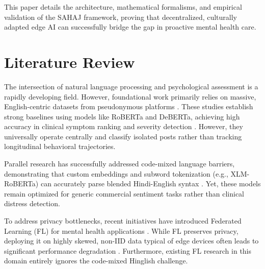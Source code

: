\documentclass[conference]{IEEEtran}
\begin{document}
This paper details the architecture, mathematical formalisms, and empirical validation of the SAHAJ framework, proving that decentralized, culturally adapted edge AI can successfully bridge the gap in proactive mental health care.

\section{Literature Review}
The intersection of natural language processing and psychological assessment is a rapidly developing field. However, foundational work primarily relies on massive, English-centric datasets from pseudonymous platforms \cite{b1,b3,b4,b5,b10}. These studies establish strong baselines using models like RoBERTa and DeBERTa, achieving high accuracy in clinical symptom ranking and severity detection \cite{b3,b4}. However, they universally operate centrally and classify isolated posts rather than tracking longitudinal behavioral trajectories.

Parallel research has successfully addressed code-mixed language barriers, demonstrating that custom embeddings and subword tokenization (e.g., XLM-RoBERTa) can accurately parse blended Hindi-English syntax \cite{b7,b8,b9}. Yet, these models remain optimized for generic commercial sentiment tasks rather than clinical distress detection.

To address privacy bottlenecks, recent initiatives have introduced Federated Learning (FL) for mental health applications \cite{b2,b6,b11}. While FL preserves privacy, deploying it on highly skewed, non-IID data typical of edge devices often leads to significant performance degradation \cite{b6,b12}. Furthermore, existing FL research in this domain entirely ignores the code-mixed Hinglish challenge.
\end{document}
